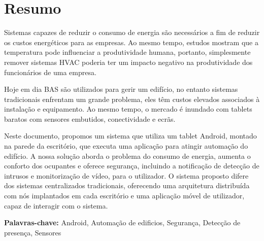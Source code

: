 \chapter*{Resumo}




Sistemas capazes de reduzir o consumo de energia são necessários a fim de reduzir os custos energéticos para as empresas. Ao mesmo tempo, estudos mostram que a temperatura pode influenciar a produtividade humana, portanto, simplesmente remover sistemas HVAC poderia ter um impacto negativo na produtividade dos funcionários de uma empresa.

Hoje em dia \ac{BAS} são utilizados para gerir um edifício, no entanto sistemas tradicionais enfrentam um grande problema, eles têm custos elevados associados à instalação e equipamento. Ao mesmo tempo, o mercado é inundado com tablets baratos com sensores embutidos, conectividade e ecrãs.



Neste documento, propomos um sistema que utiliza um tablet Android, montado na parede da escritório, que executa uma aplicação para atingir automação do edifício. A nossa solução aborda o problema do consumo de energia, aumenta o conforto dos ocupantes e oferece segurança, incluindo a notificação de detecção de intrusos e monitorização de vídeo, para o utilizador. O sistema proposto difere dos sistemas centralizados tradicionais, oferecendo uma arquitetura distribuída com nós implantados em cada escritório e uma aplicação móvel de utilizador, capaz de interagir com o sistema.






\vspace{1cm}

\textbf{\Large Palavras-chave:} Android, Automação de edificios, Segurança, Detecção de presença, Sensores

\cleardoublepage


